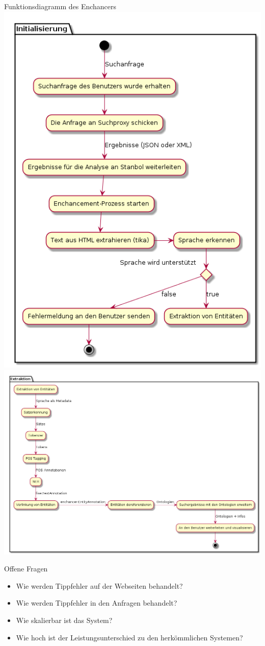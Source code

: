 \documentclass{beamer}
\begin{document}
  \begin{frame}[c]{Funktionsdiagramm des Enchancers}
  \includegraphics[width=0.45\linewidth]{diagramms/funktionsweise.png}
  \includegraphics[width=0.55\linewidth]{diagramms/funktionsweise-extraktion.png}
  \end{frame}
  
  \begin{frame}[c]{Offene Fragen}
  \begin{itemize}
  \item Wie werden Tippfehler auf der Webseiten behandelt?
  \item Wie werden Tippfehler in den Anfragen behandelt?
  \item Wie skalierbar ist das System?
  \item Wie hoch ist der Leistungsunterschied zu den herkömmlichen Systemen?
  \end{itemize}
  \end{frame}    
  
\end{document}

